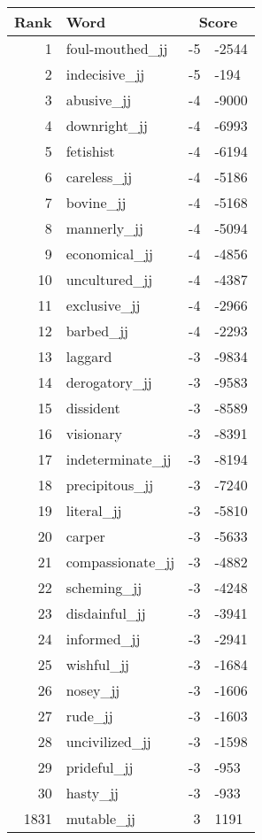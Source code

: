 \begin{longtable}[!htbp]{| rlr@{.}l |}
    \hline
    \textbf{Rank} & \textbf{Word} & \multicolumn{2}{c|}{\textbf{Score}} \\
    \hline
    \endhead
    1 & foul-mouthed\_jj & -5 & -2544 \\
    2 & indecisive\_jj & -5 & -194 \\
    3 & abusive\_jj & -4 & -9000 \\
    4 & downright\_jj & -4 & -6993 \\
    5 & fetishist & -4 & -6194 \\
    6 & careless\_jj & -4 & -5186 \\
    7 & bovine\_jj & -4 & -5168 \\
    8 & mannerly\_jj & -4 & -5094 \\
    9 & economical\_jj & -4 & -4856 \\
    10 & uncultured\_jj & -4 & -4387 \\
    11 & exclusive\_jj & -4 & -2966 \\
    12 & barbed\_jj & -4 & -2293 \\
    13 & laggard & -3 & -9834 \\
    14 & derogatory\_jj & -3 & -9583 \\
    15 & dissident & -3 & -8589 \\
    16 & visionary & -3 & -8391 \\
    17 & indeterminate\_jj & -3 & -8194 \\
    18 & precipitous\_jj & -3 & -7240 \\
    19 & literal\_jj & -3 & -5810 \\
    20 & carper & -3 & -5633 \\
    21 & compassionate\_jj & -3 & -4882 \\
    22 & scheming\_jj & -3 & -4248 \\
    23 & disdainful\_jj & -3 & -3941 \\
    24 & informed\_jj & -3 & -2941 \\
    25 & wishful\_jj & -3 & -1684 \\
    26 & nosey\_jj & -3 & -1606 \\
    27 & rude\_jj & -3 & -1603 \\
    28 & uncivilized\_jj & -3 & -1598 \\
    29 & prideful\_jj & -3 & -953 \\
    30 & hasty\_jj & -3 & -933 \\
    1831 & mutable\_jj & 3 & 1191 \\

\end{longtable}
